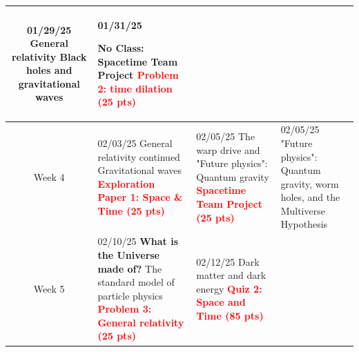 \documentclass[11pt]{article}
\begin{document}
\begin{tabularx}{\textwidth}{|c|X|X|X|}
    01/29/25 \newline
    \newline
    General relativity \newline
    Black holes and gravitational waves &

    \cellcolor{gray!20}01/31/25  \newline
    
    \textbf{No Class: Spacetime Team Project}\newline\newline
    \textcolor{red}{\textbf{Problem 2: time dilation (25 pts)}}\\
    
    \hline
    Week 4 & 
    
    02/03/25 \newline
    \newline
    General relativity continued \newline
    Gravitational waves \newline
    \textcolor{red}{\textbf{Exploration Paper 1: Space \& Time (25 pts)}} &
    
    02/05/25 \newline
    \newline
    The warp drive and "Future physics": \newline
    Quantum gravity \newline
    \textcolor{red}{\textbf{Spacetime Team Project (25 pts)}} &


    02/05/25 \newline
    \newline
    "Future physics": Quantum gravity, worm   \newline
    holes, and the Multiverse Hypothesis
    
    \\


    \hline
    Week 5 & 
     
    02/10/25 \newline
    \textbf{What is the Universe made of?}
    \newline
    The standard model of particle physics \newline\newline
    \textcolor{red}{\textbf{Problem 3: General relativity (25 pts)}}
    &
    
    02/12/25 \newline  
    \newline
    Dark matter and dark energy
    \newline\newline
    \textcolor{red}{\textbf{Quiz 2: Space and Time (85 pts)}} 
    &


\end{tabularx}
\end{document}
